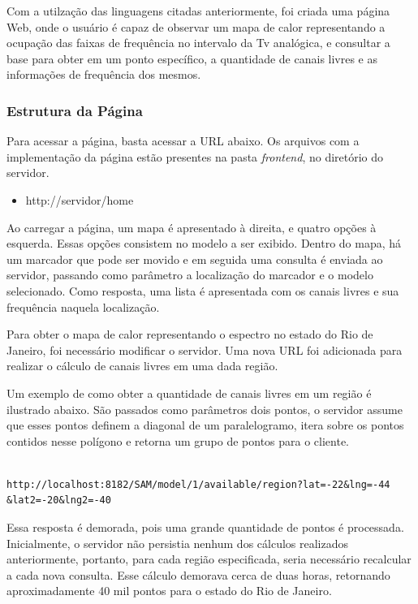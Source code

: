 Com a utilzação das linguagens citadas anteriormente, foi criada uma página Web, onde o usuário é capaz de observar um mapa de calor representando a ocupação das faixas de frequência no intervalo da Tv analógica, e consultar a base para obter em um ponto específico, a quantidade de canais livres e as informações de frequência dos mesmos.


\subsubsection{Estrutura da Página}

Para acessar a página, basta acessar a URL abaixo. Os arquivos com a implementação da página estão presentes na pasta \textit{frontend}, no diretório do servidor.

\begin{itemize}
\item http://servidor/home
\end{itemize}

Ao carregar a página, um mapa é apresentado à direita, e quatro opções à esquerda. Essas opções consistem no modelo a ser exibido. Dentro do mapa, há um marcador que pode ser movido e em seguida uma consulta é enviada ao servidor, passando como parâmetro a localização do marcador e o modelo selecionado. Como resposta, uma lista é apresentada com os canais livres e sua frequência naquela localização.

Para obter o mapa de calor representando o espectro no estado do Rio de Janeiro, foi necessário modificar o servidor. Uma nova URL foi adicionada para realizar o cálculo de canais livres em uma dada região.

Um exemplo de como obter a quantidade de canais livres em um região é ilustrado abaixo. São passados como parâmetros dois pontos, o servidor assume que esses pontos definem a diagonal de um paralelogramo, itera sobre os pontos contidos nesse polígono e retorna um grupo de pontos para o cliente.


\begin{lstlisting}			

http://localhost:8182/SAM/model/1/available/region?lat=-22&lng=-44
&lat2=-20&lng2=-40

\end{lstlisting}

Essa resposta é demorada, pois uma grande quantidade de pontos é processada. Inicialmente, o servidor não persistia nenhum dos cálculos realizados anteriormente, portanto, para cada região especificada, seria necessário recalcular a cada nova consulta. Esse cálculo demorava cerca de duas horas, retornando aproximadamente 40 mil pontos para o estado do Rio de Janeiro.

